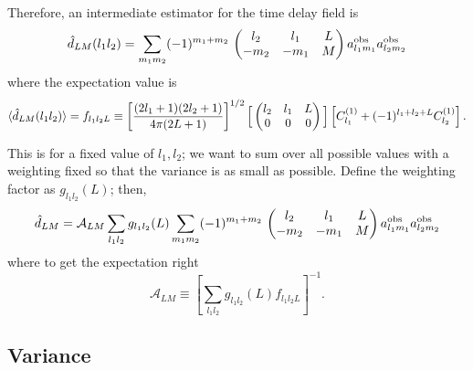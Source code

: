 \documentclass[prd,amsmath,amssymb,floatfix,superscriptaddress,nofootinbib,preprintnumbers]{revtex4-1}
\def\be{\begin{equation}}
\def\ee{\end{equation}}
\begin{document}
Therefore, an intermediate estimator for the time delay field is
\be
\hat d_{LM}(l_1l_2) =  \sum_{m_1m_2}  (-1)^{m_1+m_2}\,\left(\begin{matrix} l_2 & l_1 &L\cr -m_2&-m_1&M\end{matrix}\right)
 a^{\rm obs}_{l_1m_1} a^{\rm obs}_{l_2m_2} 
 \ee
 where the expectation value is
 \be
\langle \hat d_{LM}(l_1l_2) \rangle = f_{l_1l_2L} \equiv 
 \left[ \frac{(2l_1+1)(2l_2+1)}{4\pi (2L+1)}\right]^{1/2}
 \Big[
 \left(\begin{matrix} l_2& l_1 &L\cr 0&0&0\end{matrix}\right)
  \Big]
  \left[ C^{(1)}_{l_1} + (-1)^{l_1+l_2+L}C^{(1)}_{l_2}\right]
 .\ee
 
 This is for a fixed value of $l_1, l_2$; we want to sum over all possible values with a weighting fixed so that the variance is as small as possible. Define the weighting factor as $g_{l_1l_2}(L)$; then,
 \be
 \hat d_{LM} = \mathcal{A}_{LM}\sum_{l_1l_2} g_{l_1l_2}(L) \sum_{m_1m_2}  (-1)^{m_1+m_2}\,\left(\begin{matrix} l_2 & l_1 &L\cr -m_2&-m_1&M\end{matrix}\right)
 a^{\rm obs}_{l_1m_1} a^{\rm obs}_{l_2m_2} 
 \ee
 where to get the expectation right
 \be
 \mathcal{A}_{LM} \equiv \left[ \sum_{l_1l_2} g_{l_1l_2}(L) f_{l_1l_2L}\right]^{-1}
 .\ee
 
 \subsection{Variance}
 
\end{document}
